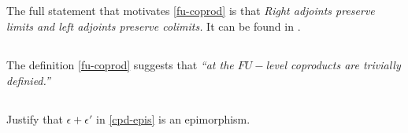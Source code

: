 \documentclass{amsart}
\begin{document}
\subsection{} The full statement that motivates \eqref{fu-coprod} is that
\emph{Right adjoints preserve limits and left adjoints preserve colimits.}
It can be found in \cite{riehl-ctic}.

\subsection{} The definition \eqref{fu-coprod} suggests that
\emph{``at the $FU-$level coproducts are trivially definied.''}

\subsection{} Justify that $\epsilon + \epsilon'$ in \eqref{cpd-epis} is
an epimorphism.



\end{document}

